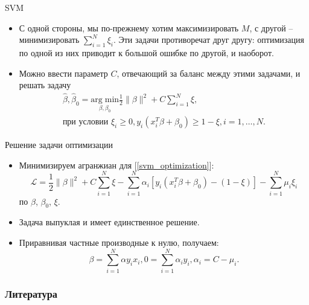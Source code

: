 \documentclass[9pt]{beamer}
\begin{document}
\begin{frame}{SVM}
    \begin{itemize}
        \item С одной стороны, мы по-прежнему хотим максимизировать $M$, с другой -- минимизировать $\sum_{i=1}^N \xi_i$. Эти задачи противоречат друг другу: оптимизация по одной из них приводит к большой ошибке по другой, и наоборот.
        \item Можно ввести параметр $C$, отвечающий за баланс между этими задачами, и решать задачу
        \begin{equation}\label{svm_optimization}
            \begin{gathered}
            \hat\beta, \hat\beta_0 = \underset{\beta,\beta_0}{\mathrm{arg\;min}} \frac{1}{2}\|\beta\|^2 + C\sum_{i=1}^N\xi,\\
            \text{при условии } \xi_i \geq 0, y_i(x_i^T\beta+\beta_0) \geq 1-\xi, i=1,\ldots,N.
            \end{gathered}
        \end{equation}
    \end{itemize}
\end{frame}

\begin{frame}{Решение задачи оптимизации}
    \begin{itemize}
        \item Минимизируем агранжиан для [\ref{svm_optimization}]:
        $$\mathcal{L} = \frac{1}{2}\|\beta\|^2 + C\sum_{i=1}^N\xi - \sum_{i=1}^N\alpha_i[y_i(x_i^T\beta+\beta_0) - (1-\xi)] - \sum_{i=1}^N\mu_i\xi_i$$
        по $\beta$, $\beta_0$, $\xi$.
        \item Задача выпуклая и имеет единственное решение.
        \item Приравнивая частные производные к нулю, получаем:
        $$\beta = \sum_{i=1}^N\alpha y_ix_i, 0 = \sum_{i=1}^N \alpha_iy_i, \alpha_i = C - \mu_i.$$
    \end{itemize}
\end{frame}

\begin{frame}[allowframebreaks]
    \frametitle{Литература}
    
    \nocite{esl}
    
\end{frame}
\end{document}
